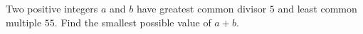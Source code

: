 Two positive integers $a$ and $b$ have greatest common divisor $5$ and least common multiple $55$. Find the smallest possible value of $a+b$.
